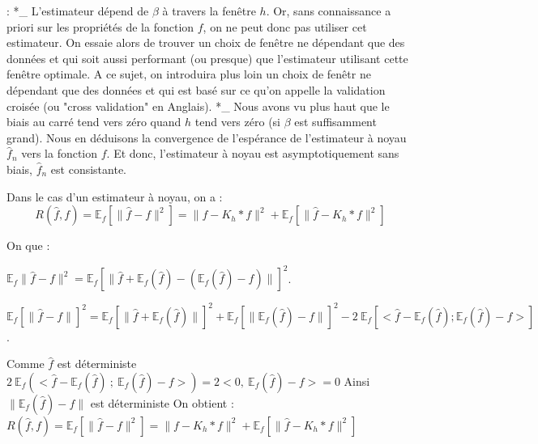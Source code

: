\documentclass[
]{article}
\begin{document}
\begin{remark}:  
  *_ L'estimateur dépend de $\beta$ à travers la fenêtre $h$. Or, sans   connaissance a priori sur les propriétés de la fonction $f$, on ne peut donc pas utiliser cet estimateur. On essaie alors de trouver un choix de fenêtre ne dépendant que des données et qui soit aussi performant (ou presque) que l'estimateur utilisant cette fenêtre optimale. A ce sujet, on introduira plus loin un choix de fenêtr ne dépendant que des données et qui est basé sur ce qu'on appelle la validation croisée (ou "cross validation" en Anglais).  
  *_ Nous avons vu plus haut que le biais au carré tend vers zéro quand $h$ tend vers zéro (si $\beta$ est suffisamment grand). Nous en déduisons la convergence de l'espérance de l'estimateur à noyau $\hat {f}_n$ vers la fonction $f$. Et donc, l'estimateur à noyau est asymptotiquement sans biais, $\hat {f}_n$ est consistante.\newline
\end{remark}

\begin{proposition}

Dans le cas d'un estimateur à noyau, on a :\newline
$$
R(\hat{f},f)=\mathbb E_f[\parallel\hat{f}-f\parallel^2 ] = \parallel f-K_h*f \parallel^2 + \mathbb E_f[\parallel\hat{f}-K_h*f \parallel^2]
$$
\end{proposition}

\begin{demonstration}
On que :\newline 


$\mathbb E_f\parallel\hat{f}-f \parallel^2 = \mathbb {E}_f[\parallel\hat{f}+\mathbb {E}_f(\hat{f} )-(\mathbb {E}_f(\hat{f} )-f)\parallel ]^2$.\newline

$\mathbb E_f[\parallel\hat{f}-f \parallel]^2 = \mathbb {E}_f[\parallel\hat{f}+\mathbb E_f(\hat{f} )\parallel]^2 +\mathbb {E}_f[\parallel\mathbb {E}_f(\hat{f} )-f\parallel] ^2 - 2~\mathbb {E}_f[<\hat{f}-\mathbb {E}_f(\hat{f});\mathbb {E}_f(\hat{f})-f>]$.\newline

Comme $\hat{f}$ est déterministe\newline 
$2~\mathbb {E}_f(<\hat{f}-\mathbb E_f(\hat{f})~;~\mathbb {E}_f(\hat{f})-f>)=2<0,~\mathbb E_f(\hat{f})-f>=0$\newline
Ainsi $\parallel\mathbb {E}_f(\hat{f} )-f\parallel$ est déterministe\newline
On obtient :\newline
$R(\hat{f},f)=\mathbb {E}_f[\parallel\hat{f}-f\parallel^2 ] = \parallel f-K_h*f \parallel^2 + \mathbb {E}_f[\parallel\hat{f}-K_h*f\parallel^2]$ 
\end{demonstration}
\end{document}
